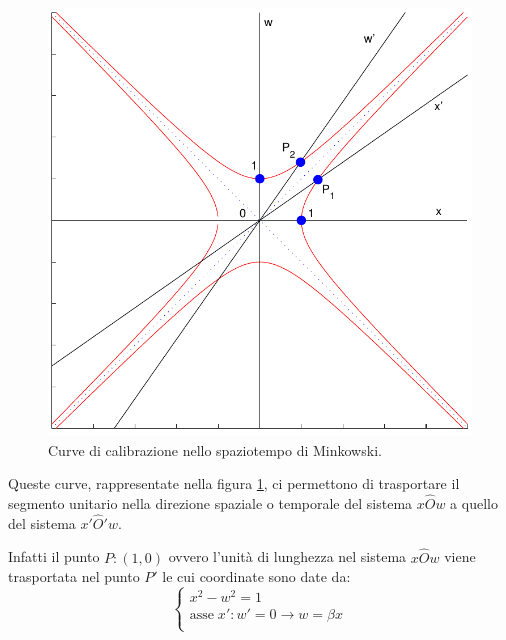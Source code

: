 \begin{figure}[htbp]
   \centering
   \includegraphics[scale=0.7]{immagini/minkowski/Minkowski_calibrazione}
   \caption{\label{Minkowski_calibrazione}Curve di calibrazione nello spaziotempo di Minkowski.}
\end{figure}


Queste curve, rappresentate nella figura \ref{Minkowski_calibrazione}, ci permettono di trasportare il segmento 
unitario nella direzione spaziale o temporale del sistema $x \hat O w$ a quello del sistema  $x' \hat O' w$.

Infatti il punto $P: (1, 0)$ ovvero l'unità di lunghezza nel sistema $x \hat O w$ viene trasportata nel punto $P'$
le cui coordinate sono date da:
\begin{equation}
\left\{\begin{array}{l}
x^2-w^2=1\\
\text{asse} \; x': w'=0 \rightarrow w =\beta x \\
\end{array}\right. 
\end{equation}

